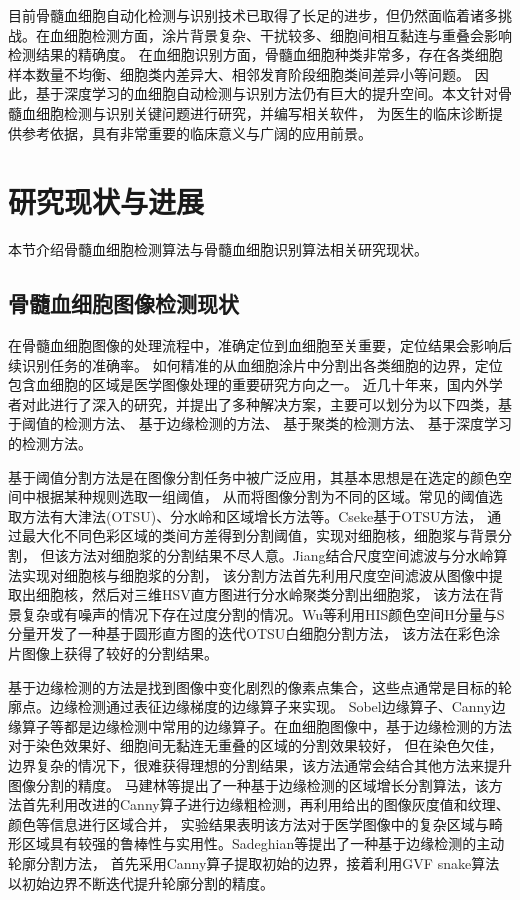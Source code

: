 目前骨髓血细胞自动化检测与识别技术已取得了长足的进步，但仍然面临着诸多挑战。在血细胞检测方面，涂片背景复杂、干扰较多、细胞间相互黏连与重叠会影响检测结果的精确度。
在血细胞识别方面，骨髓血细胞种类非常多，存在各类细胞样本数量不均衡、细胞类内差异大、相邻发育阶段细胞类间差异小等问题。
因此，基于深度学习的血细胞自动检测与识别方法仍有巨大的提升空间。本文针对骨髓血细胞检测与识别关键问题进行研究，并编写相关软件，
为医生的临床诊断提供参考依据，具有非常重要的临床意义与广阔的应用前景。



\section{研究现状与进展}
本节介绍骨髓血细胞检测算法与骨髓血细胞识别算法相关研究现状。
\subsection{骨髓血细胞图像检测现状}
在骨髓血细胞图像的处理流程中，准确定位到血细胞至关重要，定位结果会影响后续识别任务的准确率。
如何精准的从血细胞涂片中分割出各类细胞的边界，定位包含血细胞的区域是医学图像处理的重要研究方向之一。
近几十年来，国内外学者对此进行了深入的研究，并提出了多种解决方案，主要可以划分为以下四类，基于阈值的检测方法\cite{1992A,2003A,Wu2006}、
基于边缘检测的方法\cite{Ma2008Novel,Sadeghian2009A}、
基于聚类的检测方法\cite{theera2005white, ramoser2006leukocyte}、
基于深度学习的检测方法。

基于阈值分割方法是在图像分割任务中被广泛应用，其基本思想是在选定的颜色空间中根据某种规则选取一组阈值，
从而将图像分割为不同的区域。常见的阈值选取方法有大津法(OTSU)、分水岭和区域增长方法等。Cseke\cite{1992A}基于OTSU方法，
通过最大化不同色彩区域的类间方差得到分割阈值，实现对细胞核，细胞浆与背景分割，
但该方法对细胞浆的分割结果不尽人意。Jiang\cite{2003A}结合尺度空间滤波与分水岭算法实现对细胞核与细胞浆的分割，
该分割方法首先利用尺度空间滤波从图像中提取出细胞核，然后对三维HSV直方图进行分水岭聚类分割出细胞浆，
该方法在背景复杂或有噪声的情况下存在过度分割的情况。Wu\cite{Wu2006}等利用HIS颜色空间H分量与S分量开发了一种基于圆形直方图的迭代OTSU白细胞分割方法，
该方法在彩色涂片图像上获得了较好的分割结果。

基于边缘检测的方法是找到图像中变化剧烈的像素点集合，这些点通常是目标的轮廓点。边缘检测通过表征边缘梯度的边缘算子来实现。
Sobel边缘算子、Canny边缘算子等都是边缘检测中常用的边缘算子。在血细胞图像中，基于边缘检测的方法对于染色效果好、细胞间无黏连无重叠的区域的分割效果较好，
但在染色欠佳，边界复杂的情况下，很难获得理想的分割结果，该方法通常会结合其他方法来提升图像分割的精度。
马建林\cite{Ma2008Novel}等提出了一种基于边缘检测的区域增长分割算法，该方法首先利用改进的Canny算子进行边缘粗检测，再利用给出的图像灰度值和纹理、颜色等信息进行区域合并，
实验结果表明该方法对于医学图像中的复杂区域与畸形区域具有较强的鲁棒性与实用性。Sadeghian\cite{Sadeghian2009A}等提出了一种基于边缘检测的主动轮廓分割方法，
首先采用Canny算子提取初始的边界，接着利用GVF snake算法以初始边界不断迭代提升轮廓分割的精度。

